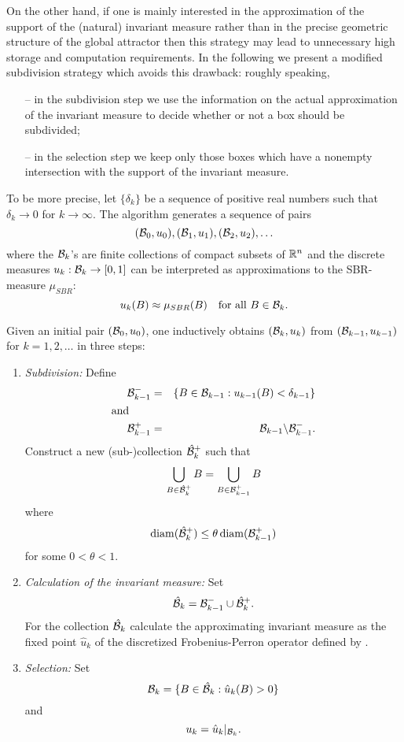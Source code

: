 \documentclass[cvs,envcountsect]{svjour}
\begin{document}
On the other hand, if one is mainly interested in the approximation of
the support of the (natural) invariant measure rather than in the precise
geometric structure of the global attractor then this strategy may lead to
unnecessary high storage and computation requirements. In the following
we present a modified subdivision strategy which avoids this drawback:
roughly speaking,
\begin{itemize}
\item[--] in the subdivision step we use
the information on the actual approximation of the
invariant measure to decide whether or not a box should be subdivided;
\item[--] in the selection step we keep only those boxes
which have a nonempty intersection with the support of the invariant measure.
\end{itemize}

To be more precise, let $\{\delta_k\}$ be a sequence of positive
real numbers such that $\delta_k\to 0$ for $k\to\infty$. The algorithm
generates a sequence of pairs
\[
(\cB_0, u_0),(\cB_1, u_1), (\cB_2, u_2), \ldots
\]
where the $\cB_k$'s are finite collections of compact subsets of
${\mathbb R}^n$ and the discrete measures $u_k:\cB_k\to[0,1]$ can be interpreted
as approximations to the SBR-measure $\mu_{SBR}$:
\[
u_k(B) \approx \mu_{SBR}(B)\quad\mbox{for all $B\in\cB_k$}.
\]

Given an initial pair $(\cB_0, u_0)$, one inductively
obtains $(\cB_k, u_k)$ from $(\cB_{k-1}, u_{k-1})$ for
$k=1,2,\ldots$ in three steps:
\begin{enumerate}
\item {\em Subdivision:} Define
\begin{eqnarray*}
\cB_{k-1}^- &=&\{B\in\cB_{k-1}: u_{k-1}(B) < \delta_{k-1}\} \\
\mbox{and}\qquad && \\ \cB_{k-1}^+ &=& \cB_{k-1}\backslash\cB_{k-1}^-.
\end{eqnarray*}
Construct a new (sub-)collection $\hat\cB_k^+$ such that
\[
\bigcup_{B\in \hat\cB_k^+} B = \bigcup_{B\in \cB_{k-1}^+} B
\]
where
\[
\diam(\hat\cB_k^+) \leq \theta\diam(\cB_{k-1}^+)
\]
for some $0 < \theta < 1$.
\item {\em Calculation of the invariant measure:}
Set
\[
\hat \cB_k = \cB_{k-1}^-\cup\hat\cB_k^+.
\]
For the collection $\hat \cB_k$ calculate the approximating
invariant measure as the fixed point $\hat u_k$ of the discretized
Frobenius-Perron operator defined by .
\item {\em Selection:} Set
\[
\cB_k = \{ B\in \hat \cB_k: \hat u_k(B) > 0\}
\]
and
\[
u_k = \hat u_k|_{\cB_k}.
\]
\end{enumerate}
\end{document}
